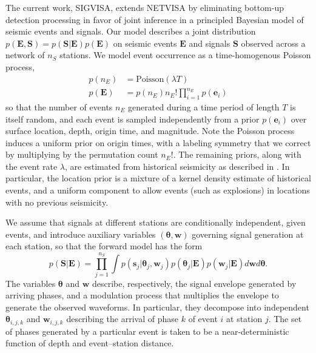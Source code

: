 \documentclass[twoside]{article} \usepackage{aistats2017}
\renewcommand{\v}[1]{\mathbf{#1}}
\begin{document}
The current work, SIGVISA, extends NETVISA by eliminating bottom-up
detection processing in favor of joint inference in a principled
Bayesian model of seismic events and signals. Our model describes a joint distribution
$p(\v{E}, \v{S}) = p(\v{S}|\v{E})p(\v{E})$ on seismic events $\v{E}$ and 
signals $\v{S}$ observed across a network of $n_S$ stations. We model event occurrence as a time-homogenous Poisson process,
\begin{align*}
p(n_E) &= \text{Poisson}(\lambda T)\\
p(\v{E}) &= p(n_E) n_E! \prod_{i=1}^{n_E} p(\v{e}_i)
\end{align*}
so that the number of events $n_E$ generated during a time period of
length $T$ is itself random, and each event is sampled independently from
a prior $p(\v{e}_i)$ over surface location, depth, origin time, and
magnitude. Note the Poisson process induces a uniform prior on origin
times, with a labeling symmetry that we correct by multiplying by the
permutation count $n_E!$. The remaining priors, along with the event
rate $\lambda$, are estimated from historical seismicity as described in \citep{netvisa}. In
particular, the location prior is a mixture of a kernel density
estimate of historical events, and a uniform component to allow events
(such as explosions) in locations with no previous seismicity.

We assume that signals at different stations are
conditionally independent, given events, and introduce auxiliary
variables $(\v{\theta}, \v{w})$ governing signal generation at each
station, so that the forward model has the form
\begin{equation}
p(\v{S}|\v{E}) = \prod_{j=1}^{n_S} \int p(\v{s}_j | \v{\theta}_j, \v{w}_j)p(\v{\theta}_j|\v{E}) p(\v{w}_j| \v{E}) d\v{w} d\v{\theta}.
\end{equation}
The variables $\v{\theta}$ and $\v{w}$ describe, respectively, the
signal envelope generated by arriving phases, and a modulation process
that multiplies the envelope to generate the observed waveforms. In
particular, they decompose into independent $\v{\theta}_{i,j,k}$ and
$\v{w}_{i,j,k}$ describing the arrival of phase $k$ of event $i$ at
station $j$. The set of phases generated by a particular event is
taken to be a near-deterministic function of depth and event--station distance.
\end{document}
